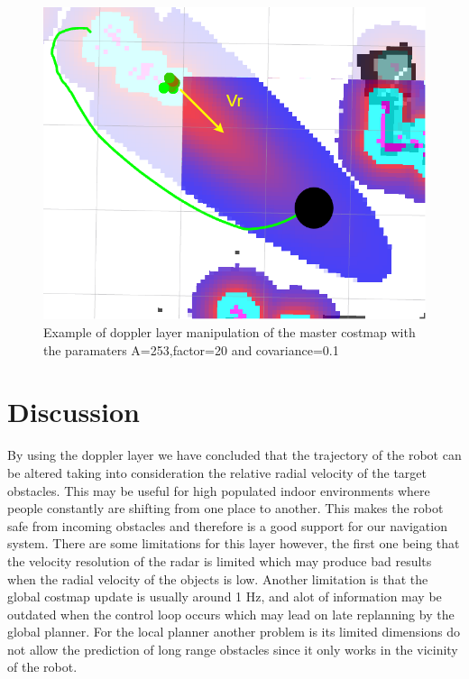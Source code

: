 \begin{figure}[h] 
\centerline{\includegraphics [width=1.0 \textwidth]{imgs/chapter6/doppler.png}}
\caption[Doppler layer manipulation of the master costmap]{Example of doppler layer manipulation of the master costmap with the paramaters  A=253,factor=20 and covariance=0.1}
\label{fig::doppler}
\end{figure}
\section{Discussion}
By using the doppler layer we have concluded that the trajectory of the robot can be altered taking into consideration the relative radial velocity of the target obstacles. This may be useful for high populated indoor environments where people constantly are shifting from one place to another. This makes the robot safe from incoming obstacles and therefore is a good support for our navigation system. There are some limitations for this layer however, the first one being that the velocity resolution of the radar is limited which may produce bad results when the radial velocity of the objects is low. Another limitation is that the global costmap update is usually around 1 Hz, and alot of information may be outdated when the control loop occurs which may lead on late replanning by the global planner. For the local planner another problem is its limited dimensions do not allow the prediction of long range obstacles since it only works in the vicinity of the robot.


